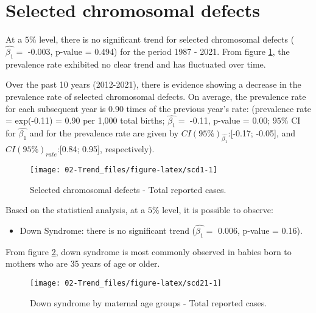 \documentclass[
]{krantz}
\providecommand{\tightlist}{%
  \setlength{\itemsep}{0pt}\setlength{\parskip}{0pt}}
\begin{document}
\clearpage

\hypertarget{section313}{%
\section{Selected chromosomal defects}\label{section313}}

At a \(5\%\) level, there is no significant trend for selected chromosomal defects (\(\hat{\beta_{1}} =\) -0.003, p-value = 0.494) for the period 1987 - 2021. From figure \ref{fig:scd1}, the prevalence rate exhibited no clear trend and has fluctuated over time.

Over the past 10 years (2012-2021), there is evidence showing a decrease in the prevalence rate of selected chromosomal defects. On average, the prevalence rate for each subsequent year is 0.90 times of the previous year's rate: (prevalence rate = exp(-0.11) = 0.90 per 1,000 total births; \(\hat{\beta_{1}} =\) -0.11, p-value = 0.00; \(95\%\) CI for \(\hat{\beta_{1}}\) and for the prevalence rate are given by \(CI(95\%)_{\hat{\beta_{1}}}\):{[}-0.17; -0.05{]}, and \(CI(95\%)_{rate}\):{[}0.84; 0.95{]}, respectively).

\begin{figure}[h]

{\centering \texttt{[image: 02-Trend\_files/figure-latex/scd1-1]} 

}

\caption{Selected chromosomal defects - Total reported cases.}\label{fig:scd1}
\end{figure}

Based on the statistical analysis, at a \(5\%\) level, it is possible to observe:

\begin{itemize}
\tightlist
\item
  Down Syndrome: there is no significant trend (\(\hat{\beta_{1}} =\) 0.006, p-value = 0.16).
\end{itemize}

From figure \ref{fig:scd21}, down syndrome is most commonly observed in babies born to mothers who are 35 years of age or older.

\begin{figure}[h]

{\centering \texttt{[image: 02-Trend\_files/figure-latex/scd21-1]} 

}

\caption{Down syndrome by maternal age groups - Total reported cases.}\label{fig:scd21}
\end{figure}
\end{document}
